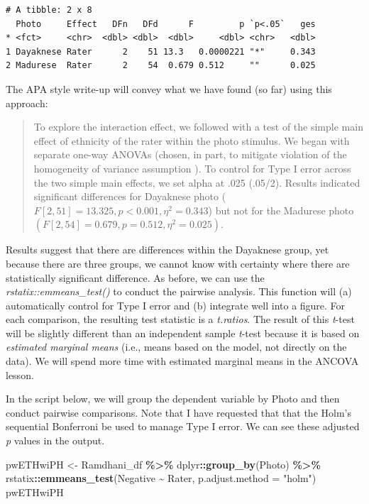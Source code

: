 \documentclass[
  11pt,
]{book}
\newenvironment{Shaded}{\begin{snugshade}}{\end{snugshade}}
\newcommand{\AttributeTok}[1]{\textcolor[rgb]{0.27,0.27,0.27}{#1}}
\newcommand{\FunctionTok}[1]{\textcolor[rgb]{0.27,0.27,0.27}{\textbf{#1}}}
\newcommand{\NormalTok}[1]{#1}
\newcommand{\OtherTok}[1]{\textcolor[rgb]{0.37,0.37,0.37}{#1}}
\newcommand{\SpecialCharTok}[1]{\textcolor[rgb]{0.43,0.43,0.43}{\textbf{#1}}}
\newcommand{\StringTok}[1]{\textcolor[rgb]{0.5,0.5,0.5}{#1}}
\begin{document}
\begin{verbatim}
# A tibble: 2 x 8
  Photo     Effect   DFn   DFd      F         p `p<.05`   ges
* <fct>     <chr>  <dbl> <dbl>  <dbl>     <dbl> <chr>   <dbl>
1 Dayaknese Rater      2    51 13.3   0.0000221 "*"     0.343
2 Madurese  Rater      2    54  0.679 0.512     ""      0.025
\end{verbatim}

The APA style write-up will convey what we have found (so far) using this approach:

\begin{quote}
To explore the interaction effect, we followed with a test of the simple main effect of ethnicity of the rater within the photo stimulus. We began with separate one-way ANOVAs (chosen, in part, to mitigate violation of the homogeneity of variance assumption \citep{kassambara_anova_nodate}). To control for Type I error across the two simple main effects, we set alpha at .025 (.05/2). Results indicated significant differences for Dayaknese photo (\(F [2, 51] = 13.325, p < 0.001, \eta ^{2} = 0.343\)) but not for the Madurese photo \((F [2, 54] = 0.679, p = 0.512, \eta ^{2} = 0.025)\).
\end{quote}

Results suggest that there are differences within the Dayaknese group, yet because there are three groups, we cannot know with certainty where there are statistically significant difference. As before, we can use the \emph{rstatix::emmeans\_test()} to conduct the pairwise analysis. This function will (a) automatically control for Type I error and (b) integrate well into a figure. For each comparison, the resulting test statistic is a \emph{t.ratios}. The result of this \emph{t}-test will be slightly different than an independent sample \emph{t}-test because it is based on \emph{estimated marginal means} (i.e., means based on the model, not directly on the data). We will spend more time with estimated marginal means in the ANCOVA lesson.

In the script below, we will group the dependent variable by Photo and then conduct pairwise comparisons. Note that I have requested that that the Holm's sequential Bonferroni be used to manage Type I error. We can see these adjusted \emph{p} values in the output.

\begin{Shaded}
\begin{Highlighting}[]
\NormalTok{pwETHwiPH }\OtherTok{\textless{}{-}}\NormalTok{ Ramdhani\_df }\SpecialCharTok{\%\textgreater{}\%}
\NormalTok{    dplyr}\SpecialCharTok{::}\FunctionTok{group\_by}\NormalTok{(Photo) }\SpecialCharTok{\%\textgreater{}\%}
\NormalTok{    rstatix}\SpecialCharTok{::}\FunctionTok{emmeans\_test}\NormalTok{(Negative }\SpecialCharTok{\textasciitilde{}}\NormalTok{ Rater, }\AttributeTok{p.adjust.method =} \StringTok{"holm"}\NormalTok{)}
\NormalTok{pwETHwiPH}
\end{Highlighting}
\end{Shaded}
\end{document}
